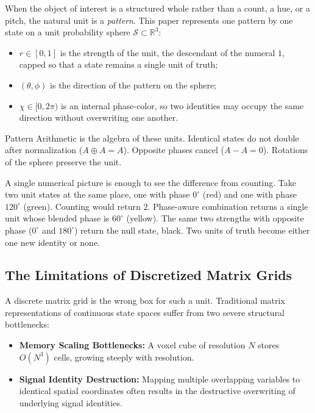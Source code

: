 \documentclass[12pt, a4paper]{article}
\begin{document}
When the object of interest is a structured whole rather than a
count, a hue, or a pitch, the natural unit is a \emph{pattern}.
This paper represents one pattern by one state on a unit
probability sphere $\mathcal{S} \subset \mathbb{R}^3$:
\begin{itemize}
    \item $r \in [0, 1]$ is the strength of the unit,
          the descendant of the numeral $1$, capped so that
          a state remains a single unit of truth;
    \item $(\theta, \phi)$ is the direction of the pattern
          on the sphere;
    \item $\chi \in [0, 2\pi)$ is an internal phase-color,
          so two identities may occupy the same direction
          without overwriting one another.
\end{itemize}
Pattern Arithmetic is the algebra of these units. Identical
states do not double after normalization ($A \oplus A = A$).
Opposite phases cancel ($A - A = 0$). Rotations of the sphere
preserve the unit.

A single numerical picture is enough to see the difference
from counting. Take two unit states at the same place,
one with phase $0^\circ$ (red) and one with phase $120^\circ$
(green). Counting would return $2$. Phase-aware combination
returns a single unit whose blended phase is $60^\circ$
(yellow). The same two strengths with opposite phase
($0^\circ$ and $180^\circ$) return the null state, black.
Two units of truth become either one new identity or none.

\subsection{The Limitations of Discretized Matrix Grids}
A discrete matrix grid is the wrong box for such a unit. Traditional matrix representations of continuous state spaces suffer from two severe structural bottlenecks:
\begin{itemize}
    \item \textbf{Memory Scaling Bottlenecks:} A voxel cube of resolution $N$ stores $O(N^3)$ cells, growing steeply with resolution.
    \item \textbf{Signal Identity Destruction:} Mapping multiple overlapping variables to identical spatial coordinates often results in the destructive overwriting of underlying signal identities.
\end{itemize}
\end{document}
